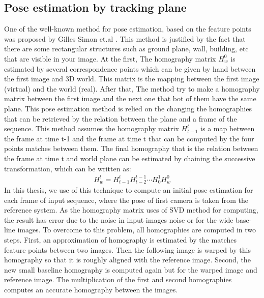 \subsection{Pose estimation by tracking plane}
One of the well-known method for pose estimation, based on the feature points was proposed by Gilles Simon et.al \cite{genc2002marker}. This method is justified by the fact that there are some rectangular structures such as ground plane, wall, building, etc that are visible in your image. At the first, The homography matrix $H_{w}^{0}$ is estimated by several correspondence points which can be given by hand between the first image and 3D world. This matrix is the mapping between the first image (virtual) and the world (real). After that, The method try to make a homography matrix between the first image and the next one that bot of them have the same plane. This pose estimation method is relied on the changing the homographies that can be retrieved by the relation between the plane and a frame of the sequence. This method assumes the homography matrix $H_{t-1}^{t}$ is a map between the frame at time t-1 and the frame at time t that can be computed by the four points matches between them. The final homography that is the relation between the frame at time t and world plane can be estimated by chaining the successive transformation, which can be written as:
\begin{gather*}
	H_{w}^{t} = H_{t-1}^{t} H_{t-2}^{t-1} \cdots H_{0}^{1} H_{w}^{0}
\end{gather*}\label{eq:homography_world_to_refrence}
In this thesis, we use of this technique to compute an initial pose estimation for each frame of input sequence, where the pose of first camera is taken from the reference system. As the homography matrix uses of SVD method for computing, the result has error due to the noise in input images noise or for the wide base-line images. To overcome to this problem, all homographies are computed in two steps. First, an approximation of homography is estimated by the matches feature points between two images. Then the following image is warped by this homography so that it is roughly aligned with the reference image. Second, the new small baseline homography is computed again but for the warped image and reference image. The multiplication of the first and second homographies computes an accurate homography between the images.

